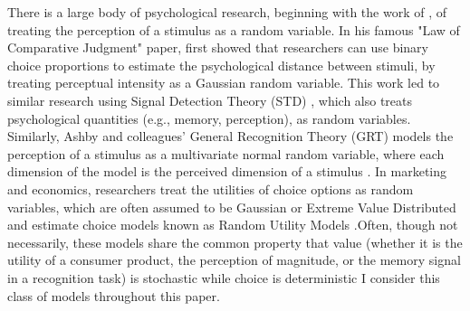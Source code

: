 There is a large body of psychological research, beginning with the work of \textcite{thurstone1927law}, of treating the perception of a stimulus as a random variable. In his famous "Law of Comparative Judgment" paper, \textcite{thurstone1927law} first showed that researchers can use binary choice proportions to estimate the psychological distance between stimuli, by treating perceptual intensity as a Gaussian random variable. This work led to similar research using Signal Detection Theory (STD) \parencite{hautus2021detection}, which also treats psychological quantities (e.g., memory, perception), as random variables. Similarly, Ashby and colleagues' General Recognition Theory (GRT) models the perception of a stimulus as a multivariate normal random variable, where each dimension of the model is the perceived dimension of a stimulus \parencite{ashbyVarietiesPerceptualIndependence1986a,ashby1988decision, ashbyUnifiedTheorySimilarity}. In marketing and economics, researchers treat the utilities of choice options as random variables, which are often assumed to be Gaussian or Extreme Value Distributed and estimate choice models known as Random Utility Models \parencite[RUMs,]{mcfadden2001economic,hausman1978conditional,train2009discrete}.Often, though not necessarily, these models share the common property that value (whether it is the utility of a consumer product, the perception of magnitude, or the memory signal in a recognition task) is stochastic while choice is deterministic \parencite[c.f.,]{benjamin2009signal} I consider this class of models throughout this paper.
